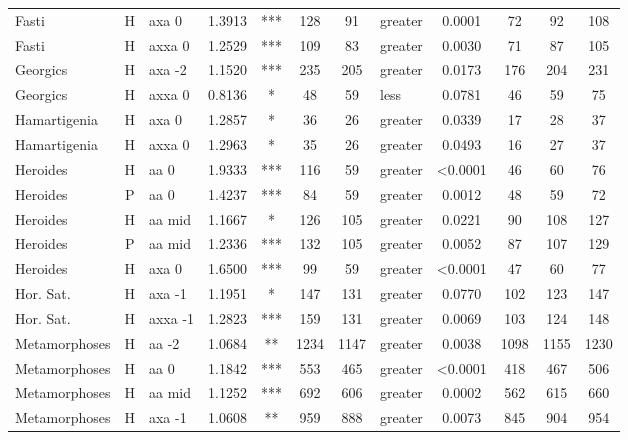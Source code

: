 \documentclass[twocolumn, switch, a4paper]{article} %
\begin{document}
\begin{table}[h!]
\begin{adjustbox}{totalheight=0.9\textheight}
\begin{tabular}{lclcccclcc@{\hspace{1\tabcolsep}}c@{\hspace{1\tabcolsep}}c}
         Fasti &     H &     axa 0 & 1.3913 &   *** &   128 &        91 &     greater & 0.0001 &    72 &    92 &   108 \\
         Fasti &     H &    axxa 0 & 1.2529 &   *** &   109 &        83 &     greater & 0.0030 &    71 &    87 &   105 \\
      Georgics &     H &    axa -2 & 1.1520 &   *** &   235 &       205 &     greater & 0.0173 &   176 &   204 &   231 \\
      Georgics &     H &    axxa 0 & 0.8136 &     * &    48 &        59 &        less & 0.0781 &    46 &    59 &    75 \\
  Hamartigenia &     H &     axa 0 & 1.2857 &     * &    36 &        26 &     greater & 0.0339 &    17 &    28 &    37 \\
  Hamartigenia &     H &    axxa 0 & 1.2963 &     * &    35 &        26 &     greater & 0.0493 &    16 &    27 &    37 \\
      Heroides &     H &      aa 0 & 1.9333 &   *** &   116 &        59 &     greater & <0.0001 &    46 &    60 &    76 \\
      Heroides &     P &      aa 0 & 1.4237 &   *** &    84 &        59 &     greater & 0.0012 &    48 &    59 &    72 \\
      Heroides &     H &    aa mid & 1.1667 &     * &   126 &       105 &     greater & 0.0221 &    90 &   108 &   127 \\
      Heroides &     P &    aa mid & 1.2336 &   *** &   132 &       105 &     greater & 0.0052 &    87 &   107 &   129 \\
      Heroides &     H &     axa 0 & 1.6500 &   *** &    99 &        59 &     greater & <0.0001 &    47 &    60 &    77 \\
     Hor. Sat. &     H &    axa -1 & 1.1951 &     * &   147 &       131 &     greater & 0.0770 &   102 &   123 &   147 \\
     Hor. Sat. &     H &   axxa -1 & 1.2823 &   *** &   159 &       131 &     greater & 0.0069 &   103 &   124 &   148 \\
 Metamorphoses &     H &     aa -2 & 1.0684 &    ** &  1234 &      1147 &     greater & 0.0038 &  1098 &  1155 &  1230 \\
 Metamorphoses &     H &      aa 0 & 1.1842 &   *** &   553 &       465 &     greater & <0.0001 &   418 &   467 &   506 \\
 Metamorphoses &     H &    aa mid & 1.1252 &   *** &   692 &       606 &     greater & 0.0002 &   562 &   615 &   660 \\
 Metamorphoses &     H &    axa -1 & 1.0608 &    ** &   959 &       888 &     greater & 0.0073 &   845 &   904 &   954 \\

\end{tabular}
\end{adjustbox}
\end{table}
\end{document}
